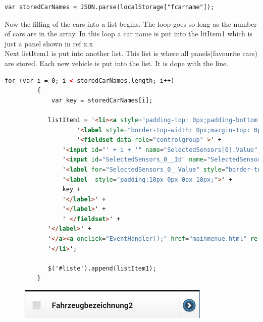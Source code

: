 \begin{lstlisting}[language=html, caption= 
start timer function,captionpos=b]
var storedCarNames = JSON.parse(localStorage["fcarname"]); 
\end{lstlisting}

Now the filling of the cars into a list begins. The loop goes so long as the number of cars are in the array. In this loop a car name is put into the litItem1 which is just a panel shown in ref x.x
\\

Next listItem1 is put into another list. This list is where all panels(favourite cars) are stored. Each new vehicle is put into the list. It is dope with the line.
\\
\begin{lstlisting}[language=html, caption= 
start timer function,captionpos=b]
for (var i = 0; i < storedCarNames.length; i++)  
         {
             var key = storedCarNames[i];

            listItem1 = '<li><a style="padding-top: 0px;padding-bottom: 0px;padding-right: 42px;padding-left: 0px;">' +
                    '<label style="border-top-width: 0px;margin-top: 0px;border-bottom-width: 0px;margin-bottom: 0px;border-left-width: 0px;border-right-width: 0px;" data-corners="false">' +
                    '<fieldset data-role="controlgroup" >' +
                '<input id="' + i + '" name="SelectedSensors[0].Value" type="checkbox" value="true" />' +
                '<input id="SelectedSensors_0__Id" name="SelectedSensors[0].Id" type="hidden" value="16" />' +
                '<label for="SelectedSensors_0__Value" style="border-top-width: 0px;margin-top: 0px;border-bottom-width: 0px;margin-bottom: 0px;border-left-width: 0px;border-right-width: 0px;">' +
                '<label  style="padding:10px 0px 0px 10px;">' +
                key +
                '</label>' +
                '</label>' +
                ' </fieldset>' +
            '</label>' +
            '</a><a onclick="EventHandler();" href="mainmenue.html" rel="external"></a>' +
            '</li>';

            $('#liste').append(listItem1);
         }
\end{lstlisting}

\begin{figure}[H]
\centering
\includegraphics[width=0.4\linewidth]{graphics/chapter4/16}
\caption{}
\label{fig:17}
\end{figure}

